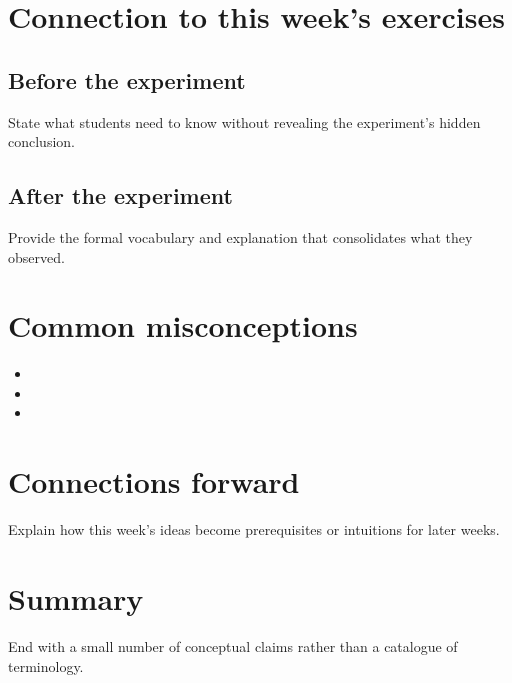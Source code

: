 \section{Connection to this week's exercises}

\subsection{Before the experiment}
State what students need to know without revealing the experiment's hidden conclusion.

\subsection{After the experiment}
Provide the formal vocabulary and explanation that consolidates what they observed.

\section{Common misconceptions}
\begin{itemize}
  \item 
  \item 
  \item 
\end{itemize}

\section{Connections forward}
Explain how this week's ideas become prerequisites or intuitions for later weeks.

\section{Summary}
End with a small number of conceptual claims rather than a catalogue of terminology.
